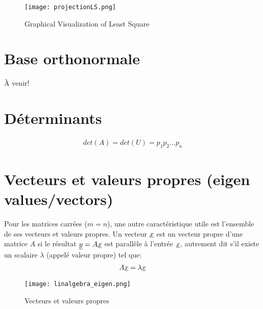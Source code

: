 \begin{figure}[htp]
	\centering
		\texttt{[image: projectionLS.png]}
	\caption{Graphical Visualization of Least Square}
\end{figure}


\section{Base orthonormale}

À venir!

\section{Déterminants}



\begin{align}
det(A) = det(U) = p_1 p_2 ... p_n
\end{align}

\section{Vecteurs et valeurs propres (eigen values/vectors)}

Pour les matrices carrées ($m=n$), une autre caractéristique utile est l'ensemble de ses vecteurs et valeurs propres. Un vecteur $\underline{x}$ est un vecteur propre d'une matrice $A$ si le résultat $\underline{y} = A \underline{x}$ est parallèle à l'entrée $\underline{x}$, autrement dit s'il existe un scalaire $\lambda$ (appelé valeur propre) tel que:
\begin{align}
A \underline{x} = \lambda  \underline{x}
\end{align}

\begin{figure}[H]
	\centering
		\texttt{[image: linalgebra\_eigen.png]}
	\caption{Vecteurs et valeurs propres}
	\label{fig:eigen}
\end{figure}


